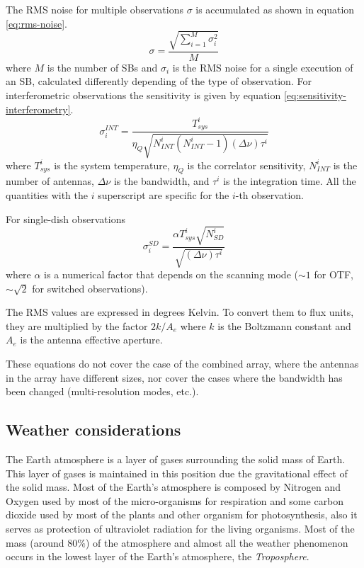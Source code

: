 \documentclass[11pt]{article}
\begin{document}
The RMS noise for multiple observations $\sigma$ is accumulated as shown in equation \ref{eq:rms-noise}.
\begin{equation}
\label{eq:rms-noise}
\sigma = \frac{\sqrt{\sum_{i=1}^M \sigma_i^2}}{M}
\end{equation}
where $M$ is the number of SBs and $\sigma_i$ is the RMS noise for a single
execution of an SB, calculated differently depending of the type of observation.
For interferometric observations the sensitivity is given by equation \ref{eq:sensitivity-interferometry}.
\begin{equation}
\label{eq:sensitivity-interferometry}
\sigma_i^{INT} = \frac{T_{sys}^i}{\eta_Q \sqrt{N_{INT}^i(N_{INT}^i-1)(\Delta\nu)\tau^i}}
\end{equation}
where $T_{sys}^i$ is the system temperature, $\eta_Q$ is the correlator sensitivity,
$N_{INT}^i$ is the number of antennas, $\Delta\nu$ is the bandwidth, and $\tau^i$ is
the integration time. All the quantities with the $i$ superscript are specific for the $i$-th
observation.

For single-dish observations
\begin{equation}
\sigma_i^{SD} = \frac{\alpha T_{sys}^i \sqrt{N_{SD}^i}}{\sqrt{(\Delta\nu)\tau^i}}
\end{equation}
where $\alpha$ is a numerical factor that depends on the scanning mode ($\sim 1$ for OTF,
$\sim \sqrt{2}$ for switched observations).

The RMS values are expressed in degrees Kelvin. To convert them to flux units, they are multiplied by the factor $2k/A_e$ where $k$ is the Boltzmann constant and $A_e$ is the antenna effective aperture.

These equations do not cover the case of the combined array, where the antennas in the array have different sizes, nor cover the cases where the bandwidth has been changed (multi-resolution modes, etc.).

\subsection{Weather considerations}

The Earth atmosphere is a layer of gases surrounding the solid mass of Earth. This layer of gases is maintained in this position due the gravitational effect of the solid mass. Most of the Earth's atmosphere is composed by Nitrogen and Oxygen used by most of the micro-organisms for respiration and some carbon dioxide used by most of the plants and other organism for photosynthesis,	also it serves as protection of ultraviolet radiation for the living organisms. Most of the mass (around $80\%$) of the atmosphere and almost all the weather phenomenon occurs in the lowest layer of the Earth's atmosphere, the \textit{Troposphere}.
\end{document}
